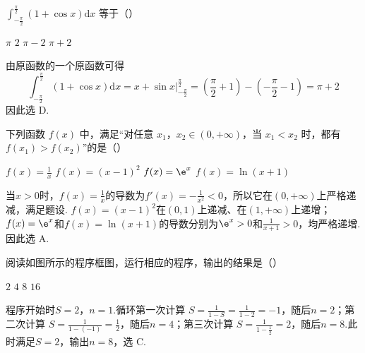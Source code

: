 \begin{problem}
\(\int_{-\frac{\pi}{2}}^{\frac{\pi}{2}}(1 + \cos x)\mathrm{d}x\) 等于（\quad）

\choices
    {\(\pi\)}
    {\(2\)}
    {\(\pi - 2\)}
    {\(\pi + 2\)}

\begin{solution}
由原函数的一个原函数可得
\[
\int_{-\frac{\pi}{2}}^{\frac{\pi}{2}}(1+\cos x)\mathrm{d}x
=\left.x+\sin x\right|_{-\frac{\pi}{2}}^{\frac{\pi}{2}}
=\left(\frac{\pi}{2}+1\right)-\left(-\frac{\pi}{2}-1\right)=\pi+2
\]
因此选 D.
\end{solution}
\end{problem}

\begin{problem}
下列函数 \( f(x) \) 中，满足“对任意 \(x_{1}\)，\(x_{2} \in (0, +\infty)\)，当 \( x_{1} < x_{2} \) 时，都有 \( f(x_{1}) > f(x_{2}) \)”的是（\quad）

\choices
    {\(f(x) = \frac{1}{x}\)}
    {\(f(x) = (x - 1)^{2}\)}
    {\(f(x) = \e^{x}\)}
    {\(f(x) = \ln (x + 1)\)}

\begin{solution}
当\(x>0\)时，\(f(x)=\frac{1}{x}\)的导数为\(f'(x)=-\frac{1}{x^2}<0\)，所以它在\((0,+\infty)\)上严格递减，满足题设.
\(f(x)=(x-1)^2\)在\((0,1)\)上递减、在\((1,+\infty)\)上递增；\(f(x)=\e^x\)和\(f(x)=\ln(x+1)\)的导数分别为\(\e^x>0\)和\(\frac{1}{x+1}>0\)，均严格递增.因此选 A.
\end{solution}
\end{problem}

\begin{problem}
阅读如图所示的程序框图，运行相应的程序，输出的结果是（\quad）


\choices
    {\(2\)}
    {\(4\)}
    {\(8\)}
    {\(16\)}

\begin{solution}
程序开始时\(S=2\)，\(n=1\).循环第一次计算
\(S=\frac{1}{1-S}=\frac{1}{1-2}=-1\)，随后\(n=2\)；第二次计算
\(S=\frac{1}{1-(-1)}=\frac{1}{2}\)，随后\(n=4\)；第三次计算
\(S=\frac{1}{1-\frac{1}{2}}=2\)，随后\(n=8\).此时满足\(S=2\)，输出\(n=8\)，选 C.
\end{solution}
\end{problem}

